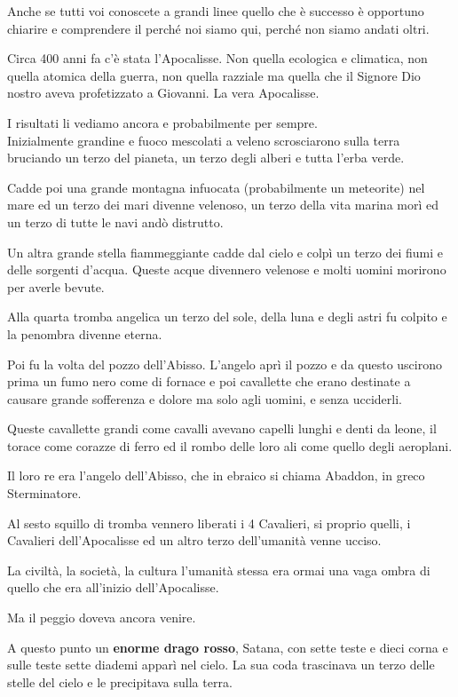 \documentclass[12pt,a4paper,twoside,openany]{book}
\begin{document}
Anche se tutti voi conoscete a grandi linee quello che è successo è opportuno chiarire e comprendere il perché noi siamo qui, perché non siamo andati oltri.

Circa 400 anni fa c'è stata l'Apocalisse. Non quella ecologica e climatica, non quella atomica della guerra, non quella razziale ma quella che il Signore Dio nostro aveva profetizzato a Giovanni. La vera Apocalisse.

I risultati li vediamo ancora e probabilmente per sempre.\\

Inizialmente grandine e fuoco mescolati a veleno scrosciarono sulla terra bruciando un terzo del pianeta, un terzo degli alberi e tutta l'erba verde.

Cadde poi una grande montagna infuocata (probabilmente un meteorite) nel mare ed un terzo dei mari divenne velenoso, un terzo della vita marina morì ed un terzo di tutte le navi andò distrutto.

Un altra grande stella fiammeggiante cadde dal cielo e colpì un terzo dei fiumi e delle sorgenti d'acqua. Queste acque divennero velenose e molti uomini morirono per averle bevute.

Alla quarta tromba angelica un terzo del sole, della luna e degli astri fu colpito e la penombra divenne eterna.

Poi fu la volta del pozzo dell'Abisso. L'angelo aprì il pozzo e da questo uscirono prima un fumo nero come di fornace e poi cavallette che erano destinate a causare grande sofferenza e dolore ma solo agli uomini, e senza ucciderli.

Queste cavallette grandi come cavalli avevano capelli lunghi e denti da leone, il torace come corazze di ferro ed il rombo delle loro ali come quello degli aeroplani.

Il loro re era l’angelo dell’Abisso, che in ebraico si chiama Abaddon, in greco Sterminatore.

Al sesto squillo di tromba vennero liberati i 4 Cavalieri, si proprio quelli, i Cavalieri dell'Apocalisse ed un altro terzo dell'umanità venne ucciso.

La civiltà, la società, la cultura l'umanità stessa era ormai una vaga ombra di quello che era all'inizio dell'Apocalisse.

Ma il peggio doveva ancora venire.

A questo punto un \textbf{enorme drago rosso}, Satana, con sette teste e dieci corna e sulle teste sette diademi apparì nel cielo. La sua coda trascinava un terzo delle stelle del cielo e le precipitava sulla terra. 
\end{document}
